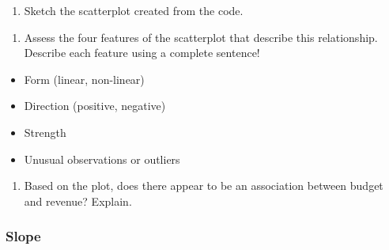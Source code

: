 \documentclass[
]{report}
\providecommand{\tightlist}{%
  \setlength{\itemsep}{0pt}\setlength{\parskip}{0pt}}
\begin{document}
\begin{enumerate}
\def\labelenumi{\arabic{enumi}.}
\tightlist
\item
  Sketch the scatterplot created from the code.
\end{enumerate}

\vspace{2in}

\begin{enumerate}
\def\labelenumi{\arabic{enumi}.}
\setcounter{enumi}{1}
\tightlist
\item
  Assess the four features of the scatterplot that describe this relationship. Describe each feature using a complete sentence!
\end{enumerate}

\begin{itemize}
\tightlist
\item
  Form (linear, non-linear)
\end{itemize}

\vspace{.2in}

\begin{itemize}
\tightlist
\item
  Direction (positive, negative)
\end{itemize}

\vspace{.2in}

\begin{itemize}
\tightlist
\item
  Strength
\end{itemize}

\vspace{.2in}

\begin{itemize}
\tightlist
\item
  Unusual observations or outliers
\end{itemize}

\vspace{.2in}

\begin{enumerate}
\def\labelenumi{\arabic{enumi}.}
\setcounter{enumi}{2}
\tightlist
\item
  Based on the plot, does there appear to be an association between budget and revenue? Explain.
\end{enumerate}

\vspace{1in}

\hypertarget{slope}{%
\subsubsection*{Slope}\label{slope}}
\end{document}
